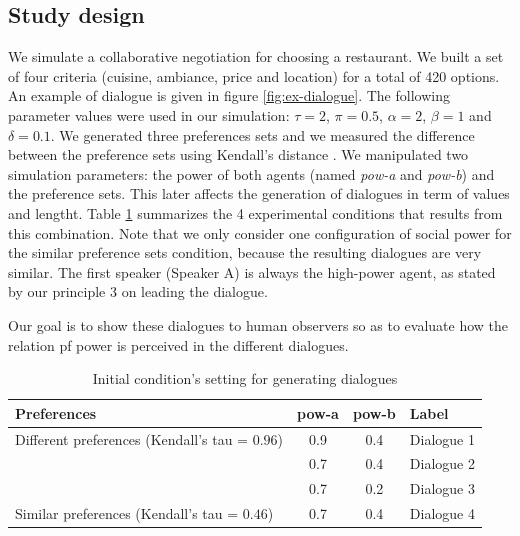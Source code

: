 \documentclass{llncs}
\begin{document}
		\subsection{Study design}
		We simulate a collaborative negotiation for choosing a restaurant. We built a set of four criteria (cuisine, ambiance, price and location) for a total of 420 options. An example of dialogue is given in figure \ref{fig:ex-dialogue}. The following parameter values were used in our simulation: $\tau=2$, $\pi=0.5$, $\alpha=2$, $\beta=1$ and $\delta=0.1$. We generated three preferences sets and we measured the difference between the preference sets using Kendall's distance \cite{bra2013Kendall}. We manipulated two simulation parameters: the power of both agents (named \emph{pow-a} and \emph{pow-b}) and the preference sets. This later affects the generation of dialogues in term of values and lengtht.  Table \ref{table:conditions} summarizes the 4 experimental conditions that results from this combination. Note that we only consider one configuration of social power for the similar preference sets condition, because the resulting dialogues are very similar. The first speaker (Speaker A) is always the high-power agent, as stated by our principle 3 on leading the dialogue.
		
		Our goal is to show these dialogues to human observers so as to evaluate how the relation pf power is perceived in the different dialogues.
		\begin{table}
			\centering
			\begin{tabular}{ |l|c|c|l| }
				\hline
				\textbf{Preferences}& \textbf{pow-a} & \textbf{pow-b} & \textbf{Label} \\ 
				\hline
				\newline\multirow{3}{*} {Different preferences (Kendall's tau = $0.96$)} & 0.9 & 0.4 & Dialogue 1 \\ \cline{2-4}
				
				\newline  & 0.7 & 0.4 & Dialogue 2\\ \cline{2-4}
				
				\newline   &0.7 & 0.2 & Dialogue 3\\ 
				\hline
				\newline Similar preferences (Kendall's tau = $0.46$) & 0.7 & 0.4 & Dialogue 4\\
				\hline
			\end{tabular}
			\caption{Initial condition's setting for generating dialogues} 
			\label{table:conditions}
		\end{table}
		
\end{document}
